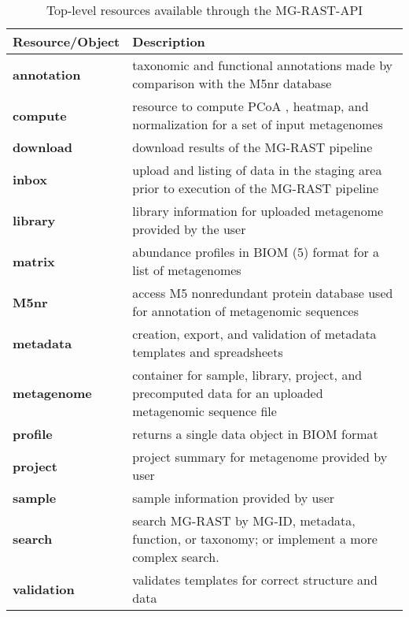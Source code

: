 \begin{table}
\caption{Top-level resources available through the MG-RAST-API}
\centering
\renewcommand{\arraystretch}{1.3}
\renewcommand\tabcolsep{10pt}
\begin{tabular}{ p{3cm} p{12cm} }
  \hline
  \hline
  \textbf{Resource/Object} & \textbf{Description} \\
  \hline
   \textbf{annotation} & taxonomic and functional annotations made by comparison with the M5nr database \\
   \textbf{compute} & resource to compute PCoA , heatmap, and normalization for a set of input metagenomes \\
   \textbf{download} & download results of the MG-RAST pipeline \\
   \textbf{inbox} & upload and listing of data in the staging area prior to execution of the MG-RAST pipeline \\
   \textbf{library} & library information for uploaded metagenome provided by the user \\
   \textbf{matrix} & abundance profiles in BIOM (5) format for a list of metagenomes \\
   \textbf{M5nr} & access M5 nonredundant protein database used for annotation of metagenomic sequences \\
   \textbf{metadata} & creation, export, and validation of metadata templates and spreadsheets \\
   \textbf{metagenome} & container for sample, library, project, and precomputed data for an uploaded metagenomic sequence file \\
   \textbf{profile} & returns a single data object in BIOM format \\
   \textbf{project} & project summary for metagenome provided by user \\
   \textbf{sample} & sample information provided by user \\
   \textbf{search} & search MG-RAST by MG-ID, metadata, function, or taxonomy; or implement a more complex search. \\
   \textbf{validation} & validates templates for correct structure and data \\
  \hline
  \hline
\end{tabular}
\label{table:upload_speeds}
\end{table}

